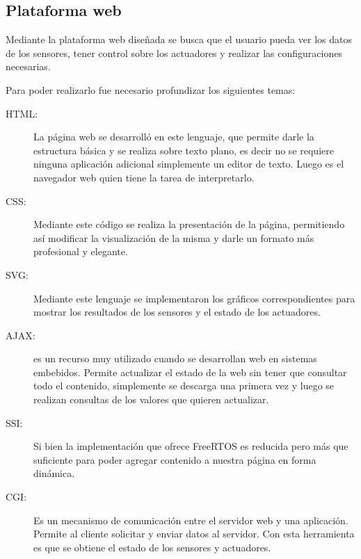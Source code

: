 \subsection{ Plataforma web}
Mediante la plataforma web diseñada se busca que el usuario pueda ver los datos de los sensores, tener control sobre los actuadores y realizar las configuraciones necesarias. 

Para poder realizarlo fue necesario profundizar los siguientes temas:
\begin{description}
  \item[HTML:] La página web se desarrolló en este lenguaje, que permite darle la estructura básica y se realiza sobre texto plano, es decir no se requiere ninguna aplicación adicional simplemente un editor de texto. Luego es el navegador web quien tiene la tarea de interpretarlo. 
  \item[CSS:] Mediante este código se realiza la presentación de la página, permitiendo así modificar la visualización de la misma y darle un formato más profesional y elegante.
  \item[SVG:] Mediante este lenguaje se implementaron los gráficos correspondientes para mostrar los resultados de los sensores y el estado de los actuadores.
  \item[AJAX:] es un recurso muy utilizado cuando se desarrollan web en sistemas embebidos. Permite actualizar el estado de la web sin tener que consultar todo el contenido, simplemente se descarga una primera vez y luego se realizan consultas de los valores que quieren actualizar. 
  \item[SSI:] Si bien la implementación que ofrece FreeRTOS es reducida pero más que suficiente para poder agregar contenido a nuestra página en forma dinámica.
  \item[CGI:] Es un mecanismo de comunicación entre el servidor web y una aplicación. Permite al cliente solicitar y enviar datos al servidor. Con esta herramienta es que se obtiene el estado de los sensores y actuadores.
\end{description}

